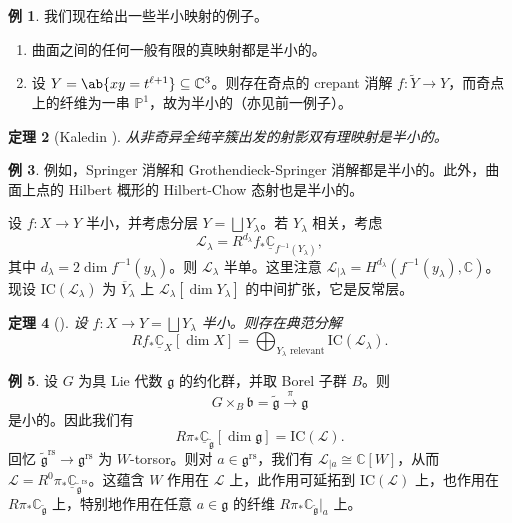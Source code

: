 \documentclass{amsart}
\newtheorem{thm}{定理}[section]
\theoremstyle{definition}
\newtheorem{exm}[thm]{例}
\newtheorem{exms}[thm]{例}
\theoremstyle{remark}
\theoremstyle{plain}
\theoremstyle{definition}
\theoremstyle{remark}
\newcommand{\C}{\mathbb{C}}
\renewcommand{\P}{\mathbb{P}}
\newcommand{\g}{\mathfrak{g}}
\renewcommand{\b}{\mathfrak{b}}
\newcommand{\mc}[1]{\mathcal{#1}}
\newcommand{\mr}[1]{\mathrm{#1}}
\newcommand{\on}[1]{\operatorname{#1}}
\newcommand{\ol}[1]{\overline{#1}}
\newcommand{\ul}[1]{\underline{#1}}
\newcommand{\1}{\mathbf{1}}
\newcommand{\2}{\mathbf{2}}
\newcommand{\3}{\mathbf{3}}
\begin{document}
\begin{exms}
    我们现在给出一些半小映射的例子。
    \begin{enumerate}
        \item 曲面之间的任何一般有限的真映射都是半小的。
        \item 设 \(Y = \ab\{xy = t^{\ell+1}\} \subseteq \C^3\)。则存在奇点的 crepant 消解 \(f \colon \tilde{Y} \to Y\)，而奇点上的纤维为一串 \(\P^1\)，故为半小的（亦见前一例子）。
    \end{enumerate}
\end{exms}

\begin{thm}[Kaledin {\cite{Kaledin2006}}]
    从非奇异全纯辛簇出发的射影双有理映射是半小的。
\end{thm}

\begin{exm}
    例如，Springer 消解和 Grothendieck-Springer 消解都是半小的。此外，曲面上点的 Hilbert 概形的 Hilbert-Chow 态射也是半小的。
\end{exm}

设 \(f \colon X \to Y\) 半小，并考虑分层 \(Y = \bigsqcup Y_{\lambda}\)。若 \(Y_{\lambda}\) 相关，考虑
\[ \mc{L}_{\lambda} = R^{d_{\lambda}} f_* \ul{\C}_{f^{-1}(Y_{\lambda})}, \]
其中 \(d_{\lambda} = 2 \dim f^{-1} (y_{\lambda})\)。则 \(\mc{L}_{\lambda}\) 半单。这里注意 \(\mc{L}_{|\lambda} = H^{d_{\lambda}}(f^{-1}(y_{\lambda}), \C)\)。现设 \(\mr{IC}(\mc{L}_{\lambda})\) 为 \(\ol{Y}_{\lambda}\) 上 \(\mc{L}_{\lambda}[\dim Y_{\lambda}]\) 的中间扩张，它是反常层。

\begin{thm}[{\cite{DeCataldoMigliorini2002}}]
    设 \(f \colon X \to Y = \bigsqcup Y_{\lambda}\) 半小。则存在典范分解
    \[ R f_* \ul{\C}_X[\dim X] = \bigoplus_{Y_{\lambda}\text{ relevant}} \mr{IC}(\mc{L}_{\lambda}). \]
\end{thm}

\begin{exm}
    设 \(G\) 为具 Lie 代数 \(\g\) 的约化群，并取 Borel 子群 \(B\)。则
    \[ G \times_B \b = \tilde{\g} \xrightarrow{\pi} \g \]
    是小的。因此我们有
    \[ R \pi_* \ul{\C}_{\tilde{\g}} [\dim \g] = \mr{IC}(\mc{L}). \]
    回忆 \(\tilde{\g}^{\on{rs}} \to \g^{\on{rs}}\) 为 \(W\)-torsor。则对 \(a \in \g^{\on{rs}}\)，我们有 \(\mc{L}_{|a} \cong \C[W]\)，从而 \(\mc{L} = R^0 \pi_* \ul{\C}_{\tilde{\g}^{\on{rs}}}\)。这蕴含 \(W\) 作用在 \(\mc{L}\) 上，此作用可延拓到 \(\mr{IC}(\mc{L})\) 上，也作用在 \(R \pi_* \C_{\tilde{\g}}\) 上，特别地作用在任意 \(a \in \g\) 的纤维 \(R \pi_* \C_{\tilde{\g}}|_a\) 上。
\end{exm}
\end{document}
